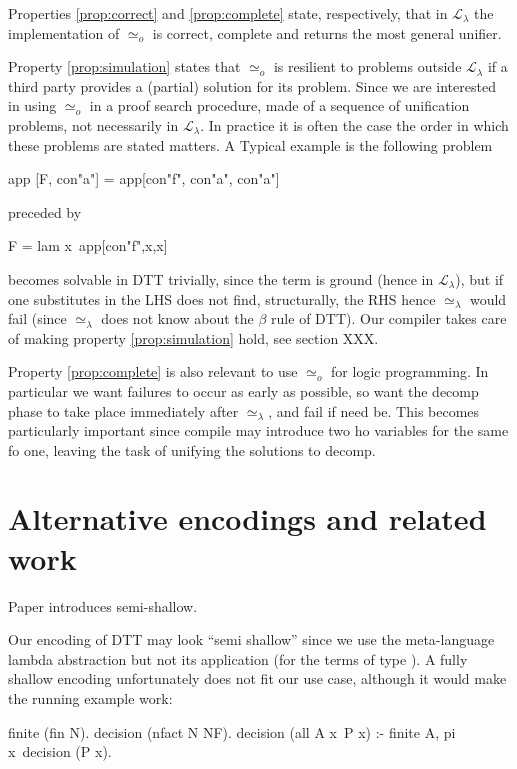 \documentclass[sigconf,natbib=false]{acmart}
\newcommand{\UnifRel}{\ensuremath{\simeq}}
\newcommand{\Uo}{\ensuremath{\UnifRel_o}\xspace}
\newcommand{\Ue}{\ensuremath{\UnifRel_\lambda}\xspace}
\newcommand{\llambda}{\ensuremath{\mathcal{L}_\lambda}\xspace}
\begin{document}
Properties \ref{prop:correct} and \ref{prop:complete} state, respectively, that
in \llambda the implementation of \Uo is correct, complete and returns the most
general unifier.

Property \ref{prop:simulation} states that \Uo is resilient to problems outside
\llambda if a third party provides a (partial) solution for its problem. Since
we are interested in using \Uo in a proof search procedure, made of a sequence
of unification problems, not necessarily in \llambda. In practice it is often
the case the order in which these problems are stated matters. A Typical example
is the following problem

\begin{elpicode}
app [F, con"a"] = app[con"f", con"a", con"a"]
\end{elpicode}

\noindent
preceded by 

\begin{elpicode}
F = lam x\ app[con"f",x,x]
\end{elpicode}

\noindent
becomes solvable in DTT trivially, since the term is ground (hence in \llambda),
but if one substitutes  in the LHS does not find,
structurally, the RHS
hence \Ue would fail (since \Ue does not know about the $\beta$ rule of DTT).
Our compiler takes care of making property \ref{prop:simulation} hold, see
section XXX.

Property \ref{prop:complete} is also relevant to use \Uo for logic programming.
In particular we want failures to occur as early as possible, so want
the decomp phase to take place immediately after \Ue, and fail if need be.
This becomes particularly important since compile may introduce two
ho variables for the same fo one, leaving the task of unifying the solutions
to decomp.

\section{Alternative encodings and related work}

Paper \cite{10.1145/2966268.2966272} introduces semi-shallow.

Our encoding of DTT may look ``semi shallow'' since we use the meta-language
lambda abstraction but not its application (for the terms of type ).
A fully shallow encoding unfortunately does not fit our use case, although
it would make the running example work:

\begin{elpicode}
finite (fin N).
decision (nfact N NF).
decision (all A x\ P x) :- finite A, pi x\ decision (P x).
\end{elpicode}
\end{document}
